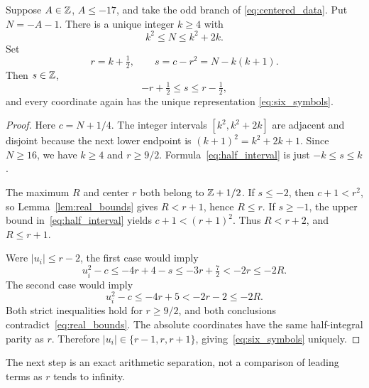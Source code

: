 \begin{lemma}
\label{lem:half_center}
Suppose \(A\in\mathbb{Z}\), \(A\le-17\), and take the odd branch of
\eqref{eq:centered_data}. Put \(N=-A-1\). There is a unique integer
\(k\ge4\) with
\[
 k^2\le N\le k^2+2k.
\]
Set
\begin{equation}
 r=k+\tfrac12,\qquad s=c-r^2=N-k(k+1).
 \label{eq:half_parameters}
\end{equation}
Then \(s\in\mathbb{Z}\),
\begin{equation}
 -r+\tfrac12\le s\le r-\tfrac12,
 \label{eq:half_interval}
\end{equation}
and every coordinate again has the unique representation
\eqref{eq:six_symbols}.
\end{lemma}
\begin{proof}
Here \(c=N+1/4\). The integer intervals \([k^2,k^2+2k]\) are
adjacent and disjoint because the next lower endpoint is
\((k+1)^2=k^2+2k+1\). Since \(N\ge16\), we have \(k\ge4\) and
\(r\ge9/2\). Formula~\eqref{eq:half_interval} is just
\(-k\le s\le k\).

The maximum \(R\) and center \(r\) both belong to \(\mathbb{Z}+1/2\).
If \(s\le-2\), then \(c+1<r^2\), so
Lemma~\ref{lem:real_bounds} gives \(R<r+1\), hence \(R\le r\).
If \(s\ge-1\), the upper bound in~\eqref{eq:half_interval} yields
\(c+1<(r+1)^2\). Thus \(R<r+2\), and \(R\le r+1\).

Were \(|u_i|\le r-2\), the first case would imply
\[
 u_i^2-c\le-4r+4-s\le-3r+\tfrac72<-2r\le-2R.
\]
The second case would imply
\[
 u_i^2-c\le-4r+5<-2r-2\le-2R.
\]
Both strict inequalities hold for \(r\ge9/2\), and both conclusions
contradict~\eqref{eq:real_bounds}. The absolute coordinates have the
same half-integral parity as \(r\). Therefore
\(|u_i|\in\{r-1,r,r+1\}\), giving~\eqref{eq:six_symbols} uniquely.
\end{proof}

The next step is an exact arithmetic separation, not a comparison of
leading terms as \(r\) tends to infinity.

